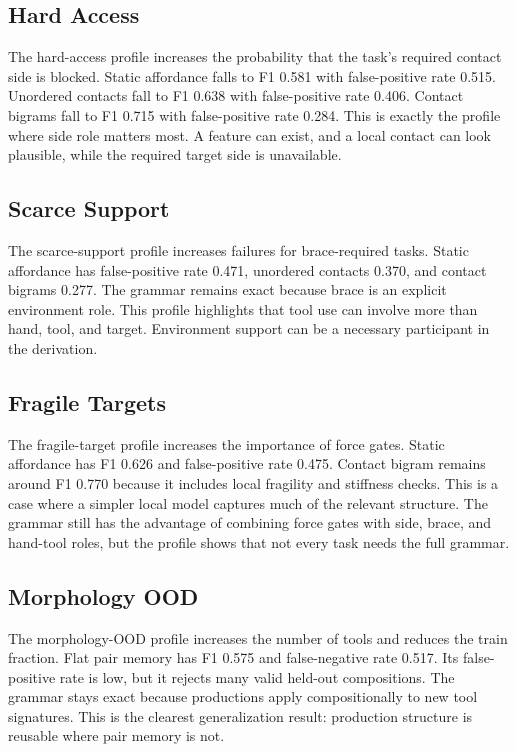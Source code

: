 \documentclass{article}
\begin{document}
\subsection{Hard Access}

The hard-access profile increases the probability that the task's required contact side is blocked. Static affordance falls to F1 0.581 with false-positive rate 0.515. Unordered contacts fall to F1 0.638 with false-positive rate 0.406. Contact bigrams fall to F1 0.715 with false-positive rate 0.284. This is exactly the profile where side role matters most. A feature can exist, and a local contact can look plausible, while the required target side is unavailable.

\subsection{Scarce Support}

The scarce-support profile increases failures for brace-required tasks. Static affordance has false-positive rate 0.471, unordered contacts 0.370, and contact bigrams 0.277. The grammar remains exact because brace is an explicit environment role. This profile highlights that tool use can involve more than hand, tool, and target. Environment support can be a necessary participant in the derivation.

\subsection{Fragile Targets}

The fragile-target profile increases the importance of force gates. Static affordance has F1 0.626 and false-positive rate 0.475. Contact bigram remains around F1 0.770 because it includes local fragility and stiffness checks. This is a case where a simpler local model captures much of the relevant structure. The grammar still has the advantage of combining force gates with side, brace, and hand-tool roles, but the profile shows that not every task needs the full grammar.

\subsection{Morphology OOD}

The morphology-OOD profile increases the number of tools and reduces the train fraction. Flat pair memory has F1 0.575 and false-negative rate 0.517. Its false-positive rate is low, but it rejects many valid held-out compositions. The grammar stays exact because productions apply compositionally to new tool signatures. This is the clearest generalization result: production structure is reusable where pair memory is not.
\end{document}
